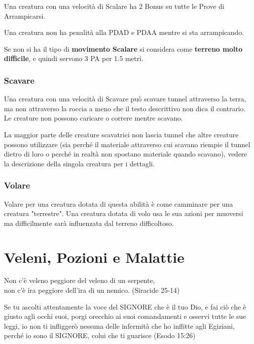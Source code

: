 \documentclass[12pt,a4paper,twoside,openany]{book}
\begin{document}
\begin{multicols}{2}
Una creatura con una velocità di Scalare ha 2 Bonus su tutte le Prove di Arrampicarsi. 

Una creatura non ha penalità alla PDAD e PDAA mentre si sta arrampicando.

Se non si ha il tipo di \textbf{movimento Scalare} si considera come \textbf{terreno molto difficile}, e quindi servono 3 PA per 1.5 metri.

\subsubsection{Scavare}\label{scavare}

Una creatura con una velocità di Scavare può scavare tunnel attraverso la terra, ma non attraverso la roccia a meno che il testo descrittivo non dica il contrario. Le creature non possono caricare o correre mentre scavano.

La maggior parte delle creature scavatrici non lascia tunnel che altre creature possono utilizzare (sia perché il materiale attraverso cui scavano riempie il tunnel dietro di loro o perché in realtà non spostano materiale quando scavano), vedere la descrizione della singola creatura per i dettagli.

\subsubsection{Volare}\label{volare}

Volare per una creatura dotata di questa abilità è come camminare per una creatura "terrestre". Una creatura dotata di volo usa le sua azioni per muoversi ma difficilmente sarà influenzata dal terreno difficoltoso.

\end{multicols}

\pagebreak
\section{Veleni, Pozioni e Malattie}

\label{veleni-e-pozioni}


\begin{changemargin}{0.3cm}{0.3cm}\begin{enfasi}{
Non c'è veleno peggiore del veleno di un serpente,\\
non c'è ira peggiore dell'ira di un nemico. (Siracide 25-14)\\\medskip

Se tu ascolti attentamente la voce del SIGNORE che è il tuo Dio, e fai ciò che è giusto agli occhi suoi, porgi orecchio ai suoi comandamenti e osservi tutte le sue leggi, io non ti infliggerò nessuna delle infermità che ho inflitte agli Egiziani, perché io sono il SIGNORE, colui che ti guarisce (Esodo 15:26)
}\end{enfasi}\end{changemargin}\medskip
\end{document}
